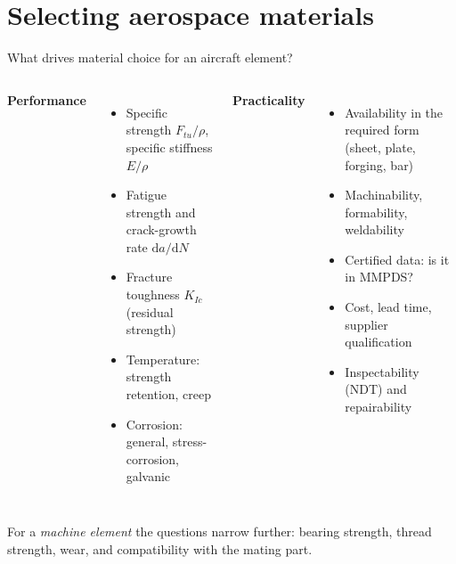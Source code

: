 \documentclass[aspectratio=169,10pt]{beamer}
\begin{document}
\section{Selecting aerospace materials}

\begin{frame}{What drives material choice for an aircraft element?}
\begin{columns}[T]
\textbf{Performance}
\begin{itemize}
  \item Specific strength $F_{tu}/\rho$, specific stiffness $E/\rho$
  \item Fatigue strength and crack-growth rate $\mathrm d a/\mathrm d N$
  \item Fracture toughness $K_{Ic}$ (residual strength)
  \item Temperature: strength retention, creep
  \item Corrosion: general, stress-corrosion, galvanic
\end{itemize}
\textbf{Practicality}
\begin{itemize}
  \item Availability in the required form (sheet, plate, forging, bar)
  \item Machinability, formability, weldability
  \item Certified data: is it in MMPDS?
  \item Cost, lead time, supplier qualification
  \item Inspectability (NDT) and repairability
\end{itemize}
\end{columns}
\vspace{4pt}
\small For a \emph{machine element} the questions narrow further: bearing strength, thread strength, wear, and compatibility with the mating part.
\end{frame}
\end{document}

